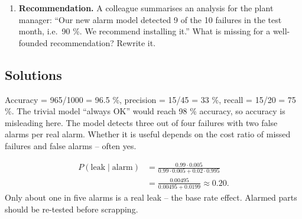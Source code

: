 \documentclass[
  letterpaper,
  DIV=11,
  numbers=noendperiod]{scrreprt}
\begin{document}
\begin{enumerate}
  prediction from the machine data could replace most of this
  inspection. For every shot of the last six months, the machine logged
  temperatures, pressures and times (120,000 shots). For 3,000 of these
  parts, the warpage was measured; about 2 \% of them exceed the limit.
  Sketch an analysis plan: target and inputs, data checks, method,
  validation, metric and decision criterion. Name the main risks.
\item
  \textbf{Recommendation.} A colleague summarises an analysis for the
  plant manager: ``Our new alarm model detected 9 of the 10 failures in
  the test month, i.e.~90 \%. We recommend installing it.'' What is
  missing for a well-founded recommendation? Rewrite it.
\end{enumerate}

\subsection{Solutions}\label{solutions-13}

\begin{tcolorbox}[enhanced jigsaw, left=2mm, title=\textcolor{quarto-callout-caution-color}{\faFire}\hspace{0.5em}{Solution to Question 1}, opacityback=0, breakable, rightrule=.15mm, arc=.35mm, toptitle=1mm, colbacktitle=quarto-callout-caution-color!10!white, opacitybacktitle=0.6, coltitle=black, colframe=quarto-callout-caution-color-frame, bottomrule=.15mm, leftrule=.75mm, bottomtitle=1mm, titlerule=0mm, toprule=.15mm, colback=white]

Accuracy = 965/1000 = 96.5 \%, precision = 15/45 = 33 \%, recall = 15/20
= 75 \%. The trivial model ``always OK'' would reach 98 \% accuracy, so
accuracy is misleading here. The model detects three out of four
failures with two false alarms per real alarm. Whether it is useful
depends on the cost ratio of missed failures and false alarms -- often
yes.

\end{tcolorbox}

\begin{tcolorbox}[enhanced jigsaw, left=2mm, title=\textcolor{quarto-callout-caution-color}{\faFire}\hspace{0.5em}{Solution to Question 2}, opacityback=0, breakable, rightrule=.15mm, arc=.35mm, toptitle=1mm, colbacktitle=quarto-callout-caution-color!10!white, opacitybacktitle=0.6, coltitle=black, colframe=quarto-callout-caution-color-frame, bottomrule=.15mm, leftrule=.75mm, bottomtitle=1mm, titlerule=0mm, toprule=.15mm, colback=white]

\[\begin{aligned} P(\text{leak} \mid \text{alarm}) &= \frac{0.99 \cdot 0.005}{0.99 \cdot 0.005 + 0.02 \cdot 0.995} \\ &= \frac{0.00495}{0.00495 + 0.0199} \approx 0.20. \end{aligned}\]
Only about one in five alarms is a real leak -- the base rate effect.
Alarmed parts should be re-tested before scrapping.

\end{tcolorbox}
\end{document}
